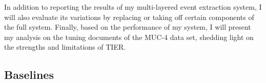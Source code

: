 In addition to reporting the results of my multi-layered event extraction system, 
I will also evaluate its variations 
by replacing or taking off certain components of the full system. 
Finally, based on the performance of my system,
I will present my analysis on the tuning documents of the MUC-4 data set, 
shedding light on the strengths and limitations of TIER.

\subsection{Baselines}

